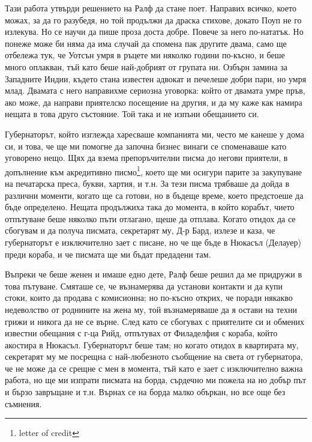 \documentclass[12pt]{book}
\begin{document}
Тази работа утвърди решението на Ралф да стане поет. Направих всичко, което можах, за да го разубедя, но той продължи да драска стихове, докато Поуп не го излекува. Но се научи да пише проза доста добре. Повече за него по-нататък. Но понеже може би няма да има случай да спомена пак другите двама, само ще отбележа тук, че Уотсън умря в ръцете ми няколко години по-късно, и беше много оплакван, тъй като беше най-добрият от групата ни. Озбърн замина за Западните Индии, където стана известен адвокат и печелеше добри пари, но умря млад. Двамата с него направихме сериозна уговорка: който от двамата умре пръв, ако може, да направи приятелско посещение на другия, и да му каже как намира нещата в това друго състояние. Той така и не изпъни обещанието си.

Губернаторът, който изглежда харесваше компанията ми, често ме канеше у дома си, и това, че ще ми помогне да започна бизнес винаги се споменаваше като уговорено нещо. Щях да взема препоръчителни писма до негови приятели, в допълнение към акредитивно писмо\footnote{letter of credit}, което ще ми осигури парите за закупуване на печатарска преса, букви, хартия, и т.н. За тези писма трябваше да дойда в различни моменти, когато ще са готови, но в бъдеще време, което предстоеше да бъде определено. Нещата продължиха така до момента, в който корабът, чието отпътуване беше няколко пъти отлагано, щеше да отплава. Когато отидох да се сбогувам и да получа писмата, секретарят му, Д-р Бард, излезе и каза, че губернаторът е изключително зает с писане, но че ще бъде в Нюкасъл (Делауер) преди кораба, и че писмата ще ми бъдат предадени там.

Въпреки че беше женен и имаше едно дете, Ралф беше решил да ме придружи в това пътуване. Смяташе се, че възнамерява да установи контакти и да купи стоки, които да продава с комисионна; но по-късно открих, че поради някакво недеволство от роднините на жена му, той възнамеряваше да я остави на техни грижи и никога да не се върне. След като се сбогувах с приятелите си и обмених известни обещания с г-ца Рийд, отпътувах от Филаделфия с кораба, който акостира в Нюкасъл. Губернаторът беше там; но когато отидох в квартирата му, секретарят му ме посрещна с най-любезното съобщение на света от губернатора, че не може да се срещне с мен в момента, тъй като е зает с изключително важна работа, но ще ми изпрати писмата на борда, сърдечно ми пожела на но добър път и бързо завръщане и т.н. Върнах се на борда малко объркан, но все още без съмнения.
\end{document}
